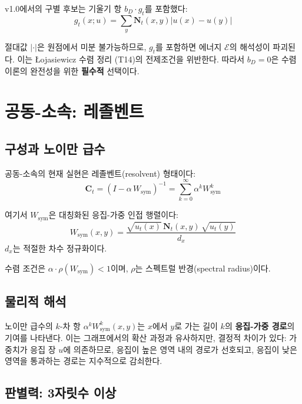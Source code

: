 v1.0에서의 구별 후보는 기울기 항 $b_D \cdot g_t$를 포함했다:
\begin{equation}
    g_t(x; u) = \sum_y \mathbf{N}_t(x,y) |u(x) - u(y)|
\end{equation}

절대값 $|\cdot|$은 원점에서 미분 불가능하므로, $g_t$를 포함하면 에너지 $\mathcal{E}$의 해석성이 파괴된다. 이는 \L{}ojasiewicz 수렴 정리 (T14)의 전제조건을 위반한다. 따라서 $b_D = 0$은 수렴 이론의 완전성을 위한 \textbf{필수적} 선택이다.


\section{공동-소속: 레졸벤트}
\label{sec:resolvent}

\subsection{구성과 노이만 급수}

공동-소속의 현재 실현은 레졸벤트(resolvent) 형태이다:
\begin{equation}
    \mathbf{C}_t = (I - \alpha\, W_{\mathrm{sym}})^{-1} = \sum_{k=0}^{\infty} \alpha^k W_{\mathrm{sym}}^k
    \label{eq:resolvent}
\end{equation}

여기서 $W_{\mathrm{sym}}$은 대칭화된 응집-가중 인접 행렬이다:
\begin{equation}
    W_{\mathrm{sym}}(x,y) = \frac{\sqrt{u_t(x)}\, \mathbf{N}_t(x,y)\, \sqrt{u_t(y)}}{d_x}
\end{equation}
$d_x$는 적절한 차수 정규화이다.

수렴 조건은 $\alpha \cdot \rho(W_{\mathrm{sym}}) < 1$이며, $\rho$는 스펙트럴 반경(spectral radius)이다.

\subsection{물리적 해석}

노이만 급수의 $k$-차 항 $\alpha^k W_{\mathrm{sym}}^k(x,y)$는 $x$에서 $y$로 가는 길이 $k$의 \textbf{응집-가중 경로}의 기여를 나타낸다. 이는 그래프에서의 확산 과정과 유사하지만, 결정적 차이가 있다: 가중치가 응집 장 $u$에 의존하므로, 응집이 높은 영역 내의 경로가 선호되고, 응집이 낮은 영역을 통과하는 경로는 지수적으로 감쇠한다.

\subsection{판별력: 3자릿수 이상}

